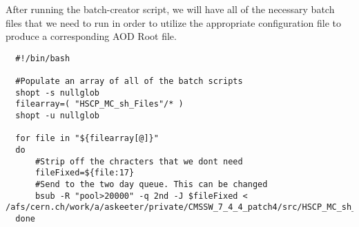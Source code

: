 \documentclass[11 pt , letterpaper , twoside , openright]{book}
\begin{document}
\begin{enumerate}
\begin{enumerate}
After running the batch-creator script, we will have all of the
necessary batch files that we need to run in order to utilize
the appropriate configuration file to produce a corresponding
AOD Root file.

\lstset{language=sh,label=batch-sender,caption= ,numbers=none}
\begin{lstlisting}
  #!/bin/bash

  #Populate an array of all of the batch scripts 
  shopt -s nullglob
  filearray=( "HSCP_MC_sh_Files"/* )
  shopt -u nullglob

  for file in "${filearray[@]}"
  do
      #Strip off the chracters that we dont need
      fileFixed=${file:17}
      #Send to the two day queue. This can be changed
      bsub -R "pool>20000" -q 2nd -J $fileFixed < /afs/cern.ch/work/a/askeeter/private/CMSSW_7_4_4_patch4/src/HSCP_MC_sh_Files/$fileFixed
  done
\end{lstlisting}
\end{enumerate}
\end{enumerate}
\end{document}
